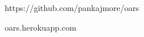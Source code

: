 \documentclass[letterpaper,12pt]{article}
\begin{document}
\begin{thebibliography}{9}

  https://github.com/pankajmore/oars

  oars.herokuapp.com

\end{thebibliography}
\end{document}
